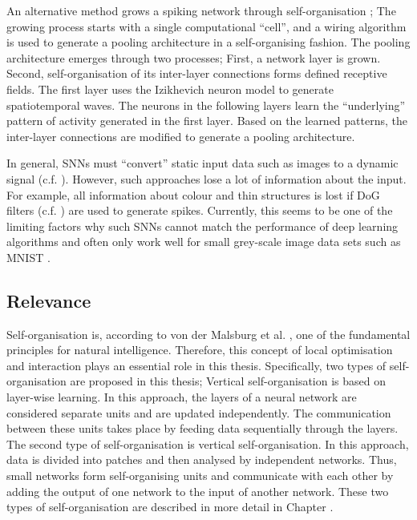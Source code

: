 An alternative method grows a spiking network through self-organisation ; The growing process starts with a single computational ``cell'', and a wiring algorithm is used to generate a pooling architecture in a self-organising fashion.
The pooling architecture emerges through two processes; First, a network layer is grown. Second, self-organisation of its inter-layer connections forms defined receptive fields.
The first layer uses the Izikhevich neuron model  to generate spatiotemporal waves.
The neurons in the following layers learn the ``underlying'' pattern of activity generated in the first layer. 
Based on the learned patterns, the inter-layer connections are modified to generate a pooling architecture.

In general, SNNs must ``convert'' static input data such as images to a dynamic signal (c.f. ). However, such approaches lose a lot of information about the input.
For example, all information about colour and thin structures is lost if DoG filters (c.f. ) are used to generate spikes.
Currently, this seems to be one of the limiting factors why such SNNs cannot match the performance of deep learning algorithms and often only work well for small grey-scale image data sets such as MNIST \cite{Lecun_Bottou_Bengio_Haffner_1998}.


\subsection{Relevance}
Self-organisation is, according to von der Malsburg et al. , one of the fundamental principles for natural intelligence.
Therefore, this concept of local optimisation and interaction plays an essential role in this thesis.
Specifically, two types of self-organisation are proposed in this thesis;
Vertical self-organisation is based on layer-wise learning. In this approach, the layers of a neural network are considered separate units and are updated independently.
The communication between these units takes place by feeding data sequentially through the layers.
The second type of self-organisation is vertical self-organisation. In this approach, data is divided into patches and then analysed by independent networks. Thus, small networks form self-organising units and communicate with each other by adding the output of one network to the input of another network.
These two types of self-organisation are described in more detail in Chapter .



